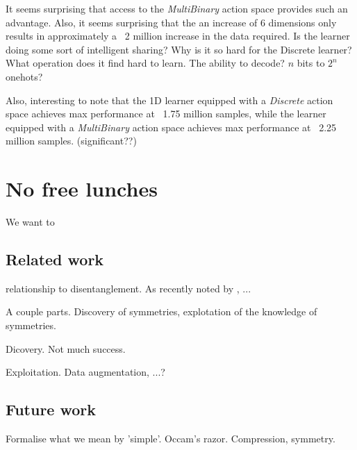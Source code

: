 It seems surprising that access to the \textit{MultiBinary} action space provides such an advantage.
Also, it seems surprising that the an increase of 6 dimensions only results in approximately a ~2 million increase in the data required.
Is the learner doing some sort of intelligent sharing?
Why is it so hard for the Discrete learner? What operation does it find hard to learn. The ability to decode? $n$ bits to $2^n$ onehots?

Also, interesting to note that the 1D learner equipped with a \textit{Discrete}
action space achieves max performance at ~1.75 million samples, while the learner
equipped with a \textit{MultiBinary} action space achieves max performance at ~2.25 million samples. (significant??)

\section{No free lunches}

We want to


\subsection{Related work}

relationship to disentanglement.
As recently noted by \cite{Caselles-Dupre2019}, ...

A couple parts. Discovery of symmetries, explotation of the knowledge of symmetries.

Dicovery. Not much success.

Exploitation. Data augmentation, ...?


\subsection{Future work}

Formalise what we mean by 'simple'. Occam's razor. Compression, symmetry.
